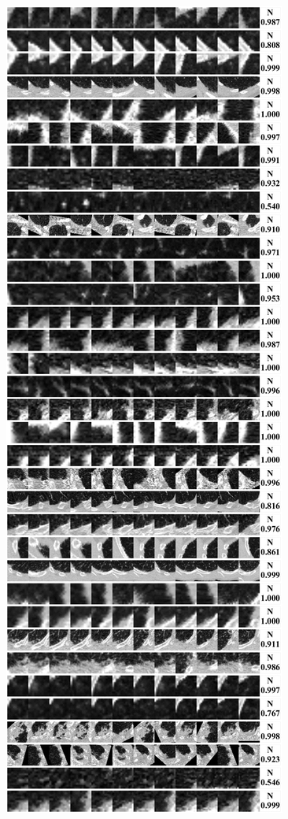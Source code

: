 \documentclass[onecolumn]{IEEEtran}
\begin{document}
\begin{figure}[H]
{\includegraphics[width=0.45\columnwidth]{./images/elcap-msnodules-nonnodule3}
}
\end{figure}
\newpage
\end{document}
